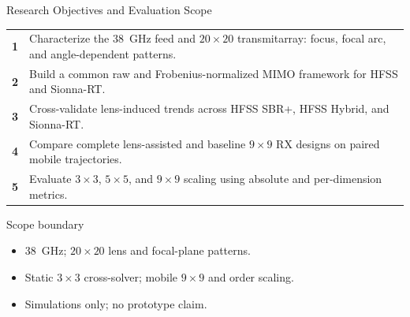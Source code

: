 \begin{frame}[t]{Research Objectives and Evaluation Scope}
\scriptsize
\setlength{\tabcolsep}{0pt}
\begin{tabularx}{\linewidth}{>{\bfseries}p{0.42cm}>{\raggedright\arraybackslash}X}
  1 & Characterize the 38~GHz feed and $20\times20$ transmitarray: focus,
      focal arc, and angle-dependent patterns. \\[0.10em]
  2 & Build a common raw and Frobenius-normalized MIMO framework for HFSS and
      Sionna-RT. \\[0.10em]
  3 & Cross-validate lens-induced trends across HFSS SBR+, HFSS Hybrid, and
      Sionna-RT. \\[0.10em]
  4 & Compare complete lens-assisted and baseline $9\times9$ RX designs on
      paired mobile trajectories. \\[0.10em]
  5 & Evaluate $3\times3$, $5\times5$, and $9\times9$ scaling using absolute
      and per-dimension metrics.
\end{tabularx}

\vspace{0.12cm}
\begin{block}{Scope boundary}
  \begin{itemize}
    \setlength{\itemsep}{-0.10em}
    \item 38~GHz; $20\!\times\!20$ lens and focal-plane patterns.
    \item Static $3\times3$ cross-solver; mobile $9\times9$ and order scaling.
    \item Simulations only; no prototype claim.
  \end{itemize}
\end{block}

\vspace{-0.05cm}
\end{frame}
